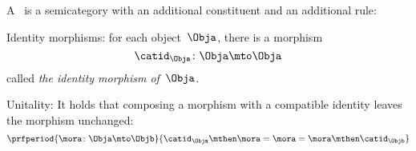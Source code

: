 


%
%
\begin{ctdefinition}[Category]
	\label{def:categorymain}
	A \emph{}~\CatC is a semicategory with an additional constituent and an additional rule:
	\begin{body}
		\constit
		\begin{compactenum}
			\item Identity morphisms: for each object~$\Obja$, there is a morphism
			\begin{equation}
				\catid_{\Obja}\colon \Obja \mto \Obja
			\end{equation}
			called \emph{the identity morphism of~$\Obja$}.
		\end{compactenum}
		\condit
		\begin{compactenum}
			\item Unitality: It holds that composing a morphism with a compatible identity leaves the morphism unchanged:
			\begin{equation}
				\prfperiod{
					\mora \colon \Obja \mto \Objb
					}{
						\catid_\Obja \mthen \mora= \mora = \mora \mthen \catid_\Objb
						}
			\end{equation}
		\end{compactenum}
	\end{body}
\end{ctdefinition}

